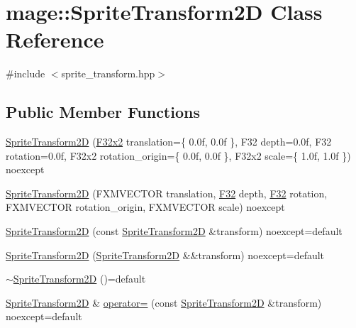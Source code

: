 \hypertarget{classmage_1_1_sprite_transform2_d}{}\section{mage\+:\+:Sprite\+Transform2D Class Reference}
\label{classmage_1_1_sprite_transform2_d}


{\ttfamily \#include $<$sprite\+\_\+transform.\+hpp$>$}

\subsection*{Public Member Functions}
\begin{DoxyCompactItemize}
\item 
\mbox{\hyperlink{classmage_1_1_sprite_transform2_d_a71571da159a45c924746637e91cbddba}{Sprite\+Transform2D}} (\mbox{\hyperlink{namespacemage_aee4759dedc8def6c6dec26b5c7eddf29}{F32x2}} translation=\{ 0.\+0f, 0.\+0f \}, F32 depth=0.\+0f, F32 rotation=0.\+0f, F32x2 rotation\+\_\+origin=\{ 0.\+0f, 0.\+0f \}, F32x2 scale=\{ 1.\+0f, 1.\+0f \}) noexcept
\item 
\mbox{\hyperlink{classmage_1_1_sprite_transform2_d_a8f9e18dd1c0078bf5ad9ceb97e08ee22}{Sprite\+Transform2D}} (F\+X\+M\+V\+E\+C\+T\+OR translation, \mbox{\hyperlink{namespacemage_aa97e833b45f06d60a0a9c4fc22ae02c0}{F32}} depth, \mbox{\hyperlink{namespacemage_aa97e833b45f06d60a0a9c4fc22ae02c0}{F32}} rotation, F\+X\+M\+V\+E\+C\+T\+OR rotation\+\_\+origin, F\+X\+M\+V\+E\+C\+T\+OR scale) noexcept
\item 
\mbox{\hyperlink{classmage_1_1_sprite_transform2_d_a3d884cb15a7507935b5cce7edd4228b3}{Sprite\+Transform2D}} (const \mbox{\hyperlink{classmage_1_1_sprite_transform2_d}{Sprite\+Transform2D}} \&transform) noexcept=default
\item 
\mbox{\hyperlink{classmage_1_1_sprite_transform2_d_a5c7324817bf4d99edbab3ed51e6bac21}{Sprite\+Transform2D}} (\mbox{\hyperlink{classmage_1_1_sprite_transform2_d}{Sprite\+Transform2D}} \&\&transform) noexcept=default
\item 
\mbox{\hyperlink{classmage_1_1_sprite_transform2_d_a8b80cdf066d1f74d9c6459faa531f0d2}{$\sim$\+Sprite\+Transform2D}} ()=default
\item 
\mbox{\hyperlink{classmage_1_1_sprite_transform2_d}{Sprite\+Transform2D}} \& \mbox{\hyperlink{classmage_1_1_sprite_transform2_d_a070aaa723dd4f6615c75c11c99523cf9}{operator=}} (const \mbox{\hyperlink{classmage_1_1_sprite_transform2_d}{Sprite\+Transform2D}} \&transform) noexcept=default

\end{DoxyCompactItemize}
